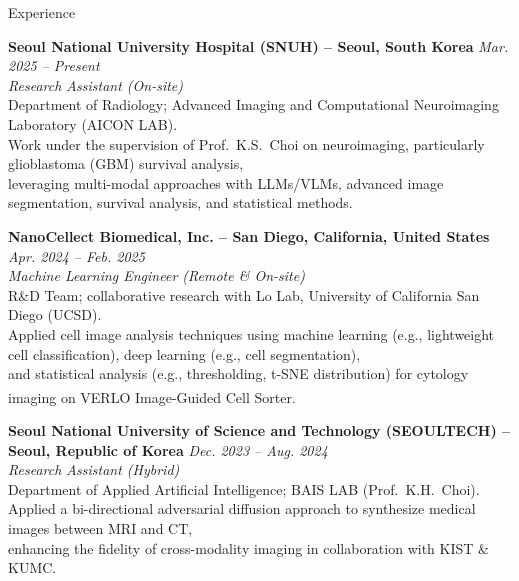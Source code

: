 \documentclass{resume}
\begin{document}
\begin{rSection}{Experience}

\bigskip
\textbf{Seoul National University Hospital (SNUH) -- Seoul, South Korea} \hfill \textit{Mar. 2025 -- Present} \\
\hspace*{0.5em} \textit{Research Assistant (On-site)} \\
\hspace*{1em} Department of Radiology; Advanced Imaging and Computational Neuroimaging Laboratory (AICON LAB). \\
\hspace*{1em} Work under the supervision of Prof.\ K.S.\ Choi on neuroimaging, particularly glioblastoma (GBM) survival analysis, \\
\hspace*{1em} leveraging multi-modal approaches with LLMs/VLMs, advanced image segmentation, survival analysis, and statistical methods.

\bigskip
\textbf{NanoCellect Biomedical, Inc. -- San Diego, California, United States} \hfill \textit{Apr. 2024 -- Feb. 2025} \\
\hspace*{0.5em} \textit{Machine Learning Engineer (Remote \& On-site)} \\
\hspace*{1em} R\&D Team; collaborative research with Lo Lab, University of California San Diego (UCSD). \\
\hspace*{1em} Applied cell image analysis techniques using machine learning (e.g., lightweight cell classification), deep learning (e.g., cell segmentation), \\
\hspace*{1em} and statistical analysis (e.g., thresholding, t-SNE distribution) for cytology imaging on VERLO\textsuperscript{\texttrademark} Image-Guided Cell Sorter.

\bigskip
\textbf{Seoul National University of Science and Technology (SEOULTECH) -- Seoul, Republic of Korea} \hfill \textit{Dec. 2023 -- Aug. 2024} \\
\hspace*{0.5em} \textit{Research Assistant (Hybrid)} \\
\hspace*{1em} Department of Applied Artificial Intelligence; BAIS LAB (Prof.\ K.H.\ Choi). \\
\hspace*{1em} Applied a bi-directional adversarial diffusion approach to synthesize medical images between MRI and CT, \\
\hspace*{1em} enhancing the fidelity of cross-modality imaging in collaboration with KIST \& KUMC.


\end{rSection}
\end{document}
